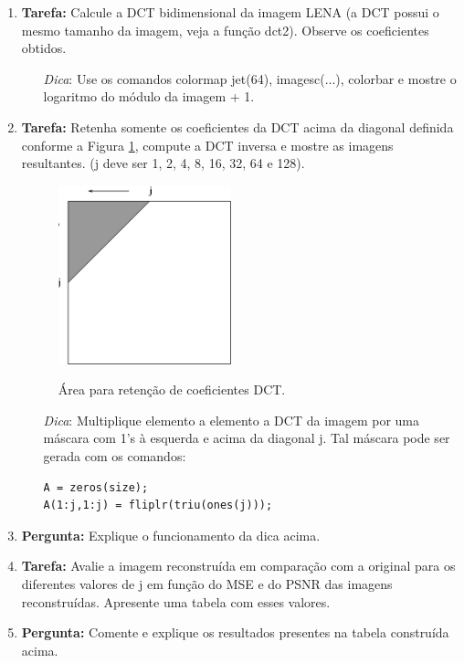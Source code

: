 \documentclass[11pt]{article}
\begin{document}
\begin{enumerate}

\item \textbf{Tarefa:} Calcule a DCT bidimensional da imagem \textsf{LENA} (a DCT possui o mesmo tamanho da imagem, veja a função \textsf{dct2}). Observe os coeficientes obtidos. 

\begin{enumerate}
\item[\textit{Dica}:] Use os comandos \textsf{colormap jet(64), imagesc(...), colorbar} e mostre o logaritmo do módulo da imagem + 1.
\end{enumerate}

\item \textbf{Tarefa:} Retenha somente os coeficientes da DCT acima da diagonal definida conforme a Figura \ref{fig:zonal}, compute a DCT inversa e mostre as imagens resultantes. (\textsf{j} deve ser 1, 2, 4, 8, 16, 32, 64 e 128). 

\begin{figure}[h!]
\begin{center}
{\includegraphics[width=5cm]{./zonal.eps}}
\caption{Área para retenção de coeficientes DCT.}\label{fig:zonal}
\end{center}
\end{figure}

\begin{enumerate}
\item[\textit{Dica}:] Multiplique elemento a elemento a DCT da imagem por uma máscara com 1's à esquerda e acima da diagonal \textsf{j}. Tal máscara pode ser gerada com os comandos:
\begin{verbatim}
A = zeros(size);
A(1:j,1:j) = fliplr(triu(ones(j)));
\end{verbatim}
\end{enumerate}

\item \textbf{Pergunta:} Explique o funcionamento da dica acima.

\item \textbf{Tarefa:} Avalie a imagem reconstruída em comparação com a original para os diferentes valores de \textsf{j} em função do MSE e do PSNR das imagens reconstruídas. Apresente uma tabela com esses valores.

\item \textbf{Pergunta:} Comente e explique os resultados presentes na tabela construída acima.

\end{enumerate}
\end{document}
